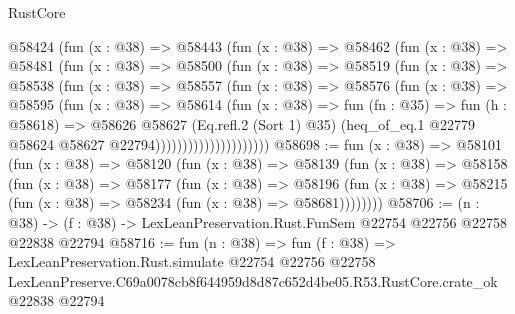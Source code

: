 \begin{lexlean}{RustCore}
\begin{coremodule}
                    @58424
                      (fun (x : @38) =>
                      @58443
                        (fun (x : @38) =>
                        @58462
                          (fun (x : @38) =>
                          @58481
                            (fun (x : @38) =>
                            @58500
                              (fun (x : @38) =>
                              @58519
                                (fun (x : @38) =>
                                @58538
                                  (fun (x : @38) =>
                                  @58557
                                    (fun (x : @38) =>
                                    @58576
                                      (fun (x : @38) =>
                                      @58595
                                        (fun (x : @38) =>
                                        @58614
                                          (fun (x : @38) =>
                                          fun (fn : @35) =>
                                          fun (h : @58618) =>
                                          @58626
                                            @58627
                                            (Eq.refl.{2} (Sort 1) @35)
                                            (heq_of_eq.{1}
                                              @22779
                                              @58624
                                              @58627
                                              @22794)))))))))))))))))))))
@58698 := fun (x : @38) =>
  @58101
    (fun (x : @38) =>
    @58120
      (fun (x : @38) =>
      @58139
        (fun (x : @38) =>
        @58158
          (fun (x : @38) =>
          @58177
            (fun (x : @38) =>
            @58196
              (fun (x : @38) => @58215 (fun (x : @38) => @58234 (fun (x : @38) => @58681))))))))
@58706 := (n : @38) ->
  (f : @38) -> LexLeanPreservation.Rust.FunSem @22754 @22756 @22758 @22838 @22794
@58716 := fun (n : @38) =>
  fun (f : @38) =>
  LexLeanPreservation.Rust.simulate
    @22754
    @22756
    @22758
    LexLeanPreserve.C69a0078cb8f644959d8d87c652d4be05.R53.RustCore.crate_ok
    @22838
    @22794
\end{coremodule}
\end{lexlean}
